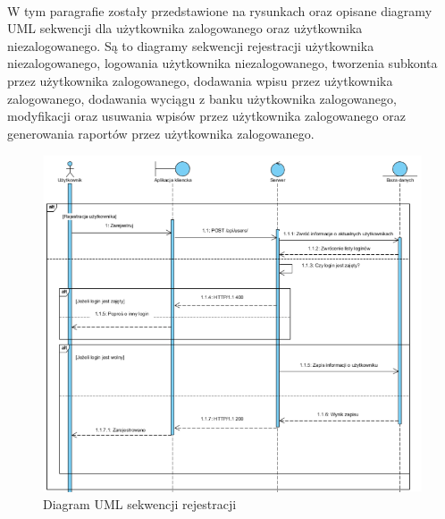 \documentclass{article}
\begin{document}
	\paragraph*{} W tym paragrafie zostały przedstawione na rysunkach oraz opisane diagramy UML sekwencji dla użytkownika zalogowanego oraz użytkownika niezalogowanego. Są to diagramy sekwencji rejestracji użytkownika niezalogowanego, logowania użytkownika niezalogowanego, tworzenia subkonta przez użytkownika zalogowanego, dodawania wpisu przez użytkownika zalogowanego, dodawania wyciągu z banku użytkownika zalogowanego, modyfikacji oraz usuwania wpisów przez użytkownika zalogowanego oraz generowania raportów przez użytkownika zalogowanego.
	\begin{figure}[H]
		\hspace*{-2.5cm}
		\includegraphics[scale=0.9]{assets/sq1.png}
		\caption[]{Diagram UML sekwencji rejestracji}
		\label{fig:umlreje}
	\end{figure}
\end{document}
